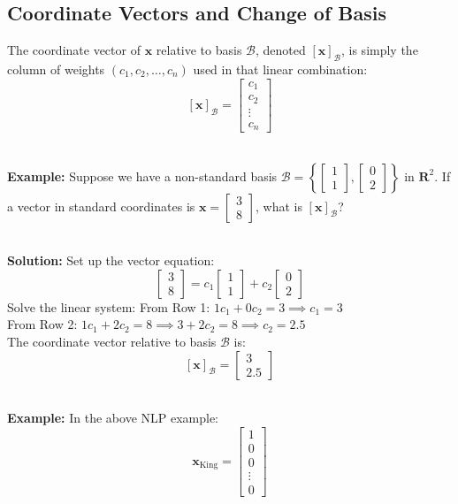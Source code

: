 \documentclass[DIV=20,oneside]{scrartcl}
\newcommand{\solution}{
	\noindent\textbf{\\Solution: }
}
\newcommand{\example}{
	\noindent\textbf{\\Example: }
}
\begin{document}
\subsection{Coordinate Vectors and Change of Basis}
The coordinate vector of $\mathbf{x}$ relative to basis $\mathcal{B}$, denoted $[\mathbf{x}]_\mathcal{B}$, is simply the column of weights $(c_1, c_2, \dots, c_n)$ used in that linear combination:$$[\mathbf{x}]_\mathcal{B} = \begin{bmatrix} c_1 \\ c_2 \\ \vdots \\ c_n \end{bmatrix}$$
\example Suppose we have a non-standard basis $\mathcal{B} = \left\{ \begin{bmatrix} 1 \\ 1 \end{bmatrix}, \begin{bmatrix} 0 \\ 2 \end{bmatrix} \right\}$ in $\mathbf{R}^2$. If a vector in standard coordinates is $\mathbf{x} = \begin{bmatrix} 3 \\ 8 \end{bmatrix}$, what is $[\mathbf{x}]_\mathcal{B}$?
\solution Set up the vector equation:$$\begin{bmatrix} 3 \\ 8 \end{bmatrix} = c_1 \begin{bmatrix} 1 \\ 1 \end{bmatrix} + c_2 \begin{bmatrix} 0 \\ 2 \end{bmatrix}$$Solve the linear system: From Row 1: $1c_1 + 0c_2 = 3 \implies c_1 = 3$\\
From Row 2: $1c_1 + 2c_2 = 8 \implies 3 + 2c_2 = 8 \implies c_2 = 2.5$\\
The coordinate vector relative to basis $\mathcal{B}$ is:$$[\mathbf{x}]_\mathcal{B} = \begin{bmatrix} 3 \\ 2.5 \end{bmatrix}$$
\example In the above NLP example: $$\mathbf{x}_{\text{King}} = \begin{bmatrix} 1 \\ 0 \\ 0 \\ \vdots \\ 0 \end{bmatrix}$$
\end{document}
